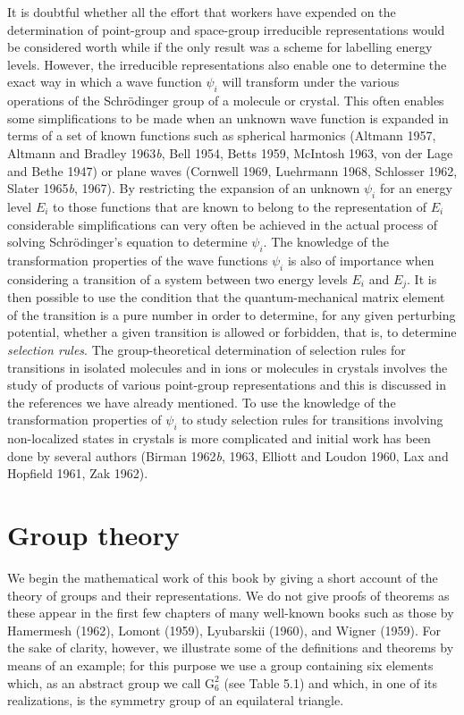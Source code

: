\documentclass[11pt,a4paper,twoside,openright]{book}
\begin{document}
It is doubtful whether all the effort that workers have expended on the determination of point-group and space-group irreducible representations would be considered worth while if the only result was a scheme for labelling energy levels. However, the irreducible representations also enable one to determine the exact way in which a wave function $\psi_{i}$ will transform under the various operations of the Schrödinger group of a molecule or crystal. This often enables some simplifications to be made when an unknown wave function is expanded in terms of a set of known functions such as spherical harmonics (Altmann 1957, Altmann and Bradley 1963\textit{b}, Bell 1954, Betts 1959, McIntosh 1963, von der Lage and Bethe 1947) or plane waves (Cornwell 1969, Luehrmann 1968, Schlosser 1962, Slater 1965\textit{b}, 1967). By restricting the expansion of an unknown $\psi_{i}$ for an energy level $E_{i}$ to those functions that are known to belong to the representation of $E_{i}$ considerable simplifications can very often be achieved in the actual process of solving Schrödinger's equation to determine $\psi_{i}$. The knowledge of the transformation properties of the wave functions $\psi_{i}$ is also of importance when considering a transition of a system between two energy levels $E_{i}$ and $E_{j}$. It is then possible to use the condition that the quantum-mechanical matrix element of the transition is a pure number in order to determine, for any given perturbing potential, whether a given transition is allowed or forbidden, that is, to determine \textit{selection rules}. The group-theoretical determination of selection rules for transitions in isolated molecules and in ions or molecules in crystals involves the study of products of various point-group representations and this is discussed in the references we have already mentioned. To use the knowledge of the transformation properties of $\psi_{i}$ to study selection rules for transitions involving non-localized states in crystals is more complicated and initial work has been done by several authors (Birman 1962\textit{b}, 1963, Elliott and Loudon 1960, Lax and Hopfield 1961, Zak 1962).

\section{Group theory}

We begin the mathematical work of this book by giving a short account of the theory of groups and their representations. We do not give proofs of theorems as these appear in the first few chapters of many well-known books such as those by Hamermesh (1962), Lomont (1959), Lyubarskii (1960), and Wigner (1959). For the sake of clarity, however, we illustrate some of the definitions and theorems by means of an example; for this purpose we use a group containing six elements which, as an abstract group we call $\mathrm{G}_6^2$ (see Table 5.1) and which, in one of its realizations, is the symmetry group of an equilateral triangle.
\end{document}
